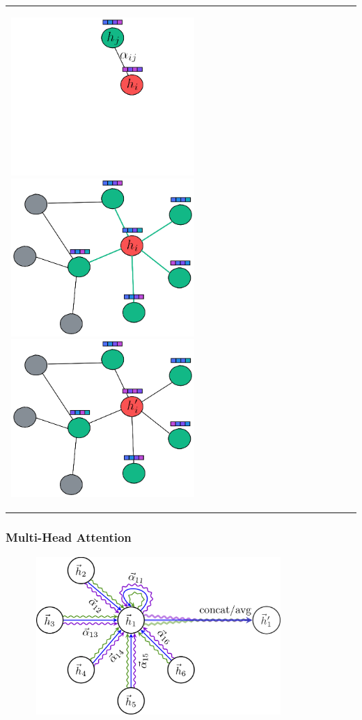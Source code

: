 \documentclass[aspectratio=169]{beamer}
\begin{document}
\begin{frame}[t]
\begin{tabular}{p{5.5cm} p{7cm}}
\begin{overprint}
            \includegraphics[width=7cm, height=6cm, valign=t]{img/gat_neighbors_weighted.png}
            \includegraphics[width=7cm, height=6cm]{img/gnn_2_hi.png}
            \includegraphics[width=7cm, height=6cm]{img/gnn_3_hi_prime.png}
        \end{overprint}
    \end{tabular}
\end{frame}

\begin{frame}
    \frametitle{Multi-Head Attention}
    \begin{figure}
        \centering
        \includegraphics[width=9.5cm, height=6cm, valign=t]{img/multi_head.png}
    \end{figure}
\end{frame}
\end{document}
